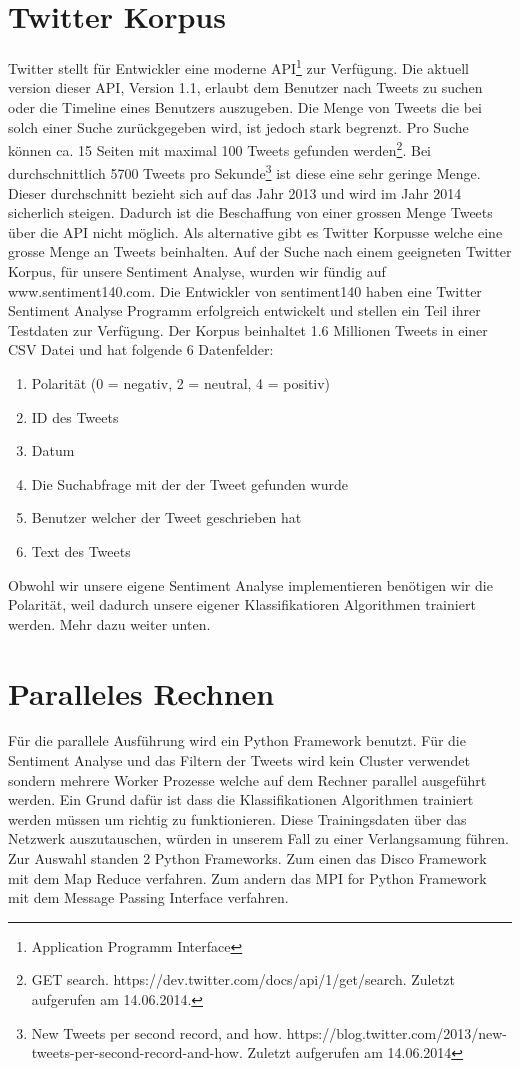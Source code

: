 \documentclass[12pt, oneside]{report}   	%
\begin{document}
\section{Twitter Korpus}
Twitter stellt für Entwickler eine moderne API\footnote{Application Programm Interface} zur Verfügung. Die aktuell version dieser API, Version 1.1, erlaubt dem Benutzer nach Tweets zu suchen oder die Timeline eines Benutzers auszugeben. Die Menge von Tweets die bei solch einer Suche zurückgegeben wird, ist jedoch stark begrenzt. Pro Suche können ca. 15 Seiten mit maximal 100 Tweets gefunden werden\footnote{GET search. https://dev.twitter.com/docs/api/1/get/search. Zuletzt aufgerufen am 14.06.2014.}. Bei durchschnittlich 5700 Tweets pro Sekunde\footnote{New Tweets per second record, and how. https://blog.twitter.com/2013/new-tweets-per-second-record-and-how. Zuletzt aufgerufen am 14.06.2014} ist diese eine sehr geringe Menge. Dieser durchschnitt bezieht sich auf das Jahr 2013 und wird im Jahr 2014 sicherlich steigen.
Dadurch ist die Beschaffung von einer grossen Menge Tweets über die API nicht möglich. Als alternative gibt es Twitter Korpusse welche eine grosse Menge an Tweets beinhalten. 
\newline{}
Auf der Suche nach einem geeigneten Twitter Korpus, für unsere Sentiment Analyse, wurden wir fündig auf www.sentiment140.com. Die Entwickler von sentiment140 haben eine Twitter Sentiment Analyse Programm erfolgreich entwickelt und stellen ein Teil ihrer Testdaten zur Verfügung. Der Korpus beinhaltet 1.6 Millionen Tweets in einer CSV Datei und hat folgende 6 Datenfelder:
\begin{enumerate}
\item Polarität (0 = negativ, 2 = neutral, 4 = positiv)
\item ID des Tweets
\item Datum
\item Die Suchabfrage mit der der Tweet gefunden wurde
\item Benutzer welcher der Tweet geschrieben hat
\item Text des Tweets
\end{enumerate}
Obwohl wir unsere eigene Sentiment Analyse implementieren benötigen wir die Polarität, weil dadurch unsere eigener Klassifikatioren Algorithmen trainiert werden. Mehr dazu weiter unten.

\section{Paralleles Rechnen}
Für die parallele Ausführung wird ein Python Framework benutzt. Für die Sentiment Analyse und das Filtern der Tweets wird kein Cluster verwendet sondern mehrere Worker Prozesse welche auf dem Rechner parallel ausgeführt werden. Ein Grund dafür ist dass die Klassifikationen Algorithmen trainiert werden müssen um richtig zu funktionieren. Diese Trainingsdaten über das Netzwerk auszutauschen, würden in unserem Fall zu einer Verlangsamung führen.
Zur Auswahl standen 2 Python Frameworks. Zum einen das Disco Framework mit dem Map Reduce verfahren. Zum andern das  MPI for Python Framework mit dem Message Passing Interface verfahren.
\end{document}
